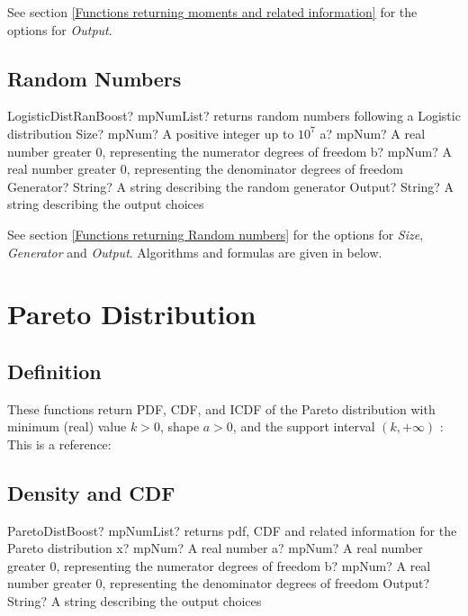\vspace{0.3cm}

See section \ref{Functions returning moments and related information} for the options for {\itshape\sffamily Output}. 



\subsection{Random Numbers}

\begin{mpFunctionsExtract}
	\mpFunctionFive
	{LogisticDistRanBoost? mpNumList? returns random numbers following a Logistic distribution}
	{Size? mpNum? A positive integer up to $10^7$}
	{a? mpNum? A real number greater 0, representing the numerator  degrees of freedom}
	{b? mpNum? A real number greater 0, representing the denominator degrees of freedom}
	{Generator? String? A string describing the random generator}
	{Output? String? A string describing the output choices}
\end{mpFunctionsExtract}

\vspace{0.3cm}

See section \ref{Functions returning Random numbers} for the options for  {\itshape\sffamily Size},  {\itshape\sffamily Generator} and {\itshape\sffamily Output}. Algorithms and formulas are given in below.






\section{Pareto Distribution}

\subsection{Definition}
These functions return PDF, CDF, and ICDF of the Pareto distribution with minimum
(real) value $k > 0$, shape $a > 0$, and the support interval $(k,+\infty)$ :
This is a reference: \cite{wiki_Pareto}


\subsection{Density and CDF}
\begin{mpFunctionsExtract}
	\mpFunctionFour
	{ParetoDistBoost? mpNumList? returns pdf, CDF and related information for the Pareto distribution}
	{x? mpNum? A real number}
	{a? mpNum? A real number greater 0, representing the numerator  degrees of freedom}
	{b? mpNum? A real number greater 0, representing the denominator degrees of freedom}
	{Output? String? A string describing the output choices}
\end{mpFunctionsExtract}

